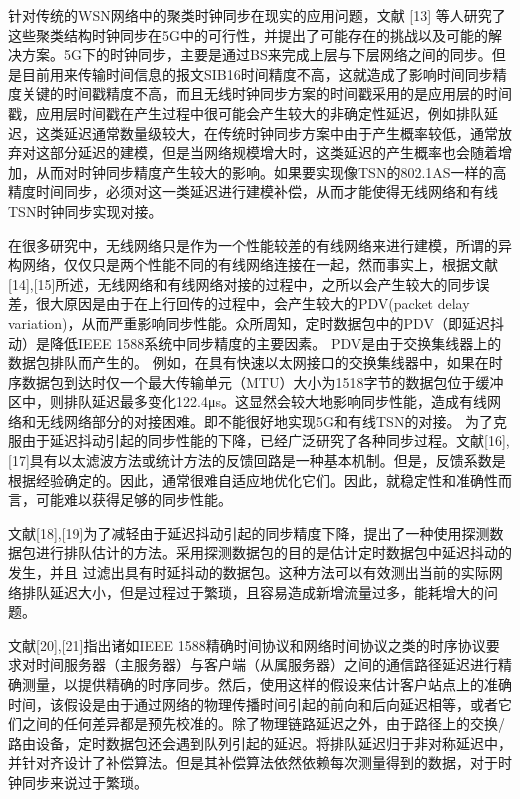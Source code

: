 \documentclass[UTF8,a4paper,12pt]{ctexart}
\numberwithin{equation}{section}
\begin{document}
针对传统的WSN网络中的聚类时钟同步在现实的应用问题，文献 [13] 等人研究了这些聚类结构时钟同步在5G中的可行性，并提出了可能存在的挑战以及可能的解决方案。5G下的时钟同步，主要是通过BS来完成上层与下层网络之间的同步。但是目前用来传输时间信息的报文SIB16时间精度不高，这就造成了影响时间同步精度关键的时间戳精度不高，而且无线时钟同步方案的时间戳采用的是应用层的时间戳，应用层时间戳在产生过程中很可能会产生较大的非确定性延迟，例如排队延迟，这类延迟通常数量级较大，在传统时钟同步方案中由于产生概率较低，通常放弃对这部分延迟的建模，但是当网络规模增大时，这类延迟的产生概率也会随着增加，从而对时钟同步精度产生较大的影响。如果要实现像TSN的802.1AS一样的高精度时间同步，必须对这一类延迟进行建模补偿，从而才能使得无线网络和有线TSN时钟同步实现对接。 


在很多研究中，无线网络只是作为一个性能较差的有线网络来进行建模，所谓的异构网络，仅仅只是两个性能不同的有线网络连接在一起，然而事实上，根据文献[14],[15]所述，无线网络和有线网络对接的过程中，之所以会产生较大的同步误差，很大原因是由于在上行回传的过程中，会产生较大的PDV(packet delay variation)，从而严重影响同步性能。众所周知，定时数据包中的PDV（即延迟抖动）是降低IEEE 1588系统中同步精度的主要因素。 PDV是由于交换集线器上的数据包排队而产生的。 例如，在具有快速以太网接口的交换集线器中，如果在时序数据包到达时仅一个最大传输单元（MTU）大小为1518字节的数据包位于缓冲区中，则排队延迟最多变化122.4μs。这显然会较大地影响同步性能，造成有线网络和无线网络部分的对接困难。即不能很好地实现5G和有线TSN的对接。
为了克服由于延迟抖动引起的同步性能的下降，已经广泛研究了各种同步过程。文献[16],[17]具有以太滤波方法或统计方法的反馈回路是一种基本机制。但是，反馈系数是根据经验确定的。因此，通常很难自适应地优化它们。因此，就稳定性和准确性而言，可能难以获得足够的同步性能。


文献[18],[19]为了减轻由于延迟抖动引起的同步精度下降，提出了一种使用探测数据包进行排队估计的方法。采用探测数据包的目的是估计定时数据包中延迟抖动的发生，并且 过滤出具有时延抖动的数据包。这种方法可以有效测出当前的实际网络排队延迟大小，但是过程过于繁琐，且容易造成新增流量过多，能耗增大的问题。


文献[20],[21]指出诸如IEEE 1588精确时间协议和网络时间协议之类的时序协议要求对时间服务器（主服务器）与客户端（从属服务器）之间的通信路径延迟进行精确测量，以提供精确的时序同步。然后，使用这样的假设来估计客户站点上的准确时间，该假设是由于通过网络的物理传播时间引起的前向和后向延迟相等，或者它们之间的任何差异都是预先校准的。除了物理链路延迟之外，由于路径上的交换/路由设备，定时数据包还会遇到队列引起的延迟。将排队延迟归于非对称延迟中，并针对齐设计了补偿算法。但是其补偿算法依然依赖每次测量得到的数据，对于时钟同步来说过于繁琐。
\end{document}
